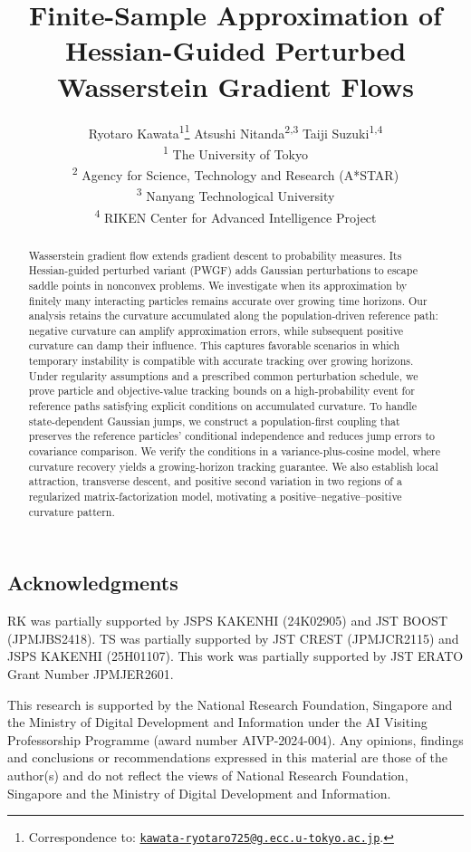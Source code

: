 \documentclass[11pt,a4paper]{article}
\title{Finite-Sample Approximation of Hessian-Guided Perturbed Wasserstein Gradient Flows}
\author{%
  Ryotaro Kawata\textsuperscript{1}\thanks{Correspondence to:
    \href{mailto:kawata-ryotaro725@g.ecc.u-tokyo.ac.jp}{\nolinkurl{kawata-ryotaro725@g.ecc.u-tokyo.ac.jp}}.}%
  \quad Atsushi Nitanda\textsuperscript{2,3}%
  \quad Taiji Suzuki\textsuperscript{1,4}\\[0.5em]
  \normalsize\textsuperscript{1} The University of Tokyo\\
  \normalsize\textsuperscript{2} Agency for Science, Technology and Research (A*STAR)\\
  \normalsize\textsuperscript{3} Nanyang Technological University\\
  \normalsize\textsuperscript{4} RIKEN Center for Advanced Intelligence Project
}
\date{}
\begin{document}
\maketitle

\begin{abstract}
\setlength{\parindent}{0pt}
\noindent
Wasserstein gradient flow extends gradient descent to probability measures.
Its Hessian-guided perturbed variant (PWGF) adds Gaussian perturbations to
escape saddle points in nonconvex problems.
We investigate when its approximation by finitely many interacting particles
remains accurate over growing time horizons. Our analysis retains the curvature accumulated along
the population-driven reference path: negative curvature can amplify approximation
errors, while subsequent positive curvature can damp their influence. This
captures favorable scenarios in which temporary instability is compatible with
accurate tracking over growing horizons. Under regularity assumptions and a
prescribed common perturbation schedule, we prove particle and objective-value
tracking bounds on a high-probability event for reference paths satisfying
explicit conditions on accumulated curvature. To handle state-dependent Gaussian
jumps, we construct a population-first coupling that preserves the reference
particles' conditional independence and reduces jump errors to covariance
comparison. We verify the conditions in a variance-plus-cosine model, where
curvature recovery yields a growing-horizon tracking guarantee. We also establish local attraction, transverse
descent, and positive second variation in two regions of a regularized
matrix-factorization model, motivating a positive--negative--positive curvature
pattern.
\end{abstract}



\subsection*{Acknowledgments}
RK was partially supported by JSPS KAKENHI (24K02905) and JST BOOST (JPMJBS2418).
TS was partially supported by JST CREST (JPMJCR2115) and JSPS KAKENHI (25H01107).
This work was partially supported by JST ERATO Grant Number JPMJER2601.

This research is supported by the National Research Foundation, Singapore and
the Ministry of Digital Development and Information under the AI Visiting
Professorship Programme (award number AIVP-2024-004). Any opinions, findings and
conclusions or recommendations expressed in this material are those of the
author(s) and do not reflect the views of National Research Foundation, Singapore
and the Ministry of Digital Development and Information.






\clearpage
\appendix






\end{document}
